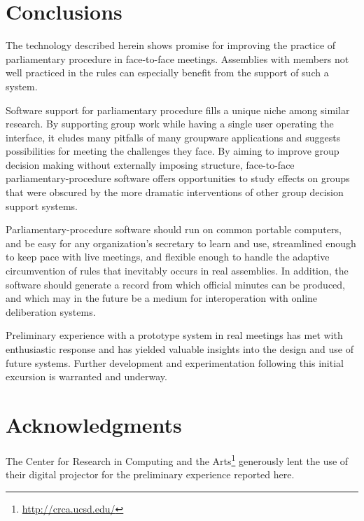 \documentclass{acm_proc_article-sp}
\begin{document}





\section{Conclusions}  %

The technology described herein shows promise for improving the practice of parliamentary procedure in face-to-face meetings. Assemblies with members not well practiced in the rules can especially benefit from the support of such a system.


Software support for parliamentary procedure fills a unique niche among similar research. By supporting group work while having a single user operating the interface, it eludes many pitfalls of many groupware applications and suggests possibilities for meeting the challenges they face. By aiming to improve group decision making without externally imposing structure, face-to-face parliamentary-procedure software offers opportunities to study effects on groups that were obscured by the more dramatic interventions of other group decision support systems.

Parliamentary-procedure software should run on common portable computers, and be easy for any organization's secretary to learn and use, streamlined enough to keep pace with live meetings, and flexible enough to handle the adaptive circumvention of rules that inevitably occurs in real assemblies. In addition, the software should generate a record from which official minutes can be produced, and which may in the future be a medium for interoperation with online deliberation systems.

Preliminary experience with a prototype system in real meetings has met with enthusiastic response and has yielded valuable insights into the design and use of future systems. Further development and experimentation following this initial excursion is warranted and underway.

\section{Acknowledgments}  %

The Center for Research in Computing and the Arts\footnote{\url{http://crca.ucsd.edu/}} generously lent the use of their digital projector for the preliminary experience reported here.


 
\end{document}
